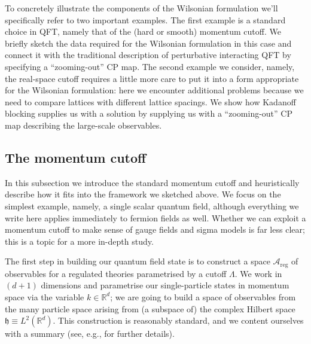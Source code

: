 \documentclass[11pt]{amsart}
\theoremstyle{plain}%
\theoremstyle{definition}
\theoremstyle{remark}
\begin{document}
To concretely illustrate the components of the Wilsonian formulation we'll specifically refer to two important examples. The first example is a standard choice in QFT, namely that of the (hard or smooth) momentum cutoff. We briefly sketch the data required for the Wilsonian formulation in this case and connect it with the traditional description of perturbative interacting QFT by specifying a ``zooming-out'' CP map. The second example we consider, namely, the real-space cutoff requires a little more care to put it into a form appropriate for the Wilsonian formulation: here we encounter additional problems because we need to compare lattices with different lattice spacings. We show how Kadanoff blocking supplies us with a solution by supplying us with a ``zooming-out'' CP map describing the large-scale observables. 

\subsection{The momentum cutoff}
In this subsection we introduce the standard momentum cutoff and heuristically describe how it fits into the framework we sketched above. We focus on the simplest example, namely, a single scalar quantum field, although everything we write here applies immediately to fermion fields as well. Whether we can exploit a momentum cutoff to make sense of gauge fields and sigma models is far less clear; this is a topic for a more in-depth study.  

The first step in building our quantum field state is to construct a space $\mathcal{A}_{\text{reg}}$ of observables for a regulated theories parametrised by a cutoff $\Lambda$. We work in $(d+1)$ dimensions and parametrise our single-particle states in momentum space via the variable $k\in\mathbb{R}^d$; we are going to build a space of observables from the many particle space arising from (a subspace of) the complex Hilbert space $\mathfrak{h} \equiv L^2(\mathbb{R}^d)$. This construction is reasonably standard, and we content ourselves with a summary (see, e.g., \cite{bratteli_operator_1997} for further details). 
\end{document}
